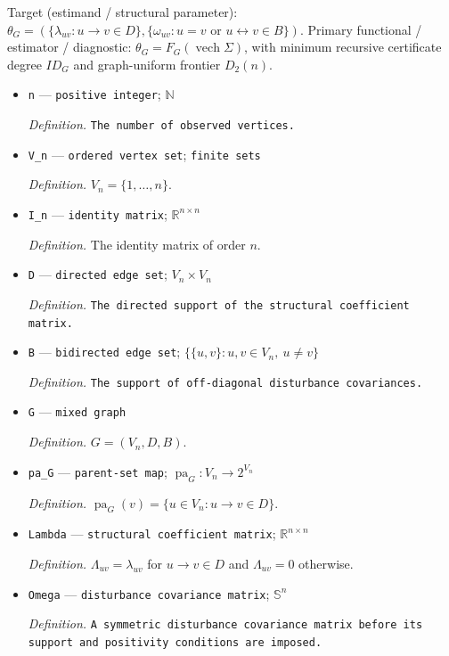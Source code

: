 \documentclass{article}
\begin{document}
Target (estimand / structural parameter): \(\theta_G=(\{\lambda_{uv}:u\to v\in D\},\{\omega_{uv}:u=v\text{ or }u\leftrightarrow v\in B\})\).
Primary functional / estimator / diagnostic: \(\theta_G=F_G(\operatorname{vech}\Sigma)\), with minimum recursive certificate degree \(ID_G\) and graph-uniform frontier \(D_2(n)\).
\begin{itemize}
  \item \texttt{n} --- \texttt{positive integer}; \(\mathbb N\)
  \par\smallskip\noindent\emph{Definition.} \texttt{The number of observed vertices.}
  \item \texttt{V\_\allowbreak{}n} --- \texttt{ordered vertex set}; \texttt{finite sets}
  \par\smallskip\noindent\emph{Definition.} \(V_n=\{1,\ldots,n\}\).
  \item \texttt{I\_\allowbreak{}n} --- \texttt{identity matrix}; \(\mathbb R^{n\times n}\)
  \par\smallskip\noindent\emph{Definition.} The identity matrix of order \(n\).
  \item \texttt{D} --- \texttt{directed edge set}; \(V_n\times V_n\)
  \par\smallskip\noindent\emph{Definition.} \texttt{The directed support of the structural coefficient matrix.}
  \item \texttt{B} --- \texttt{bidirected edge set}; \(\{\{u,v\}:u,v\in V_n,\ u\ne v\}\)
  \par\smallskip\noindent\emph{Definition.} \texttt{The support of off-\allowbreak{}diagonal disturbance covariances.}
  \item \texttt{G} --- \texttt{mixed graph}
  \par\smallskip\noindent\emph{Definition.} \(G=(V_n,D,B)\).
  \item \texttt{pa\_\allowbreak{}G} --- \texttt{parent-\allowbreak{}set map}; \(\operatorname{pa}_G:V_n\to 2^{V_n}\)
  \par\smallskip\noindent\emph{Definition.} \(\operatorname{pa}_G(v)=\{u\in V_n:u\to v\in D\}\).
  \item \texttt{Lambda} --- \texttt{structural coefficient matrix}; \(\mathbb R^{n\times n}\)
  \par\smallskip\noindent\emph{Definition.} \(\Lambda_{uv}=\lambda_{uv}\) for \(u\to v\in D\) and \(\Lambda_{uv}=0\) otherwise.
  \item \texttt{Omega} --- \texttt{disturbance covariance matrix}; \(\mathbb S^{n}\)
  \par\smallskip\noindent\emph{Definition.} \texttt{A symmetric disturbance covariance matrix before its support and positivity conditions are imposed.}

\end{itemize}
\end{document}
